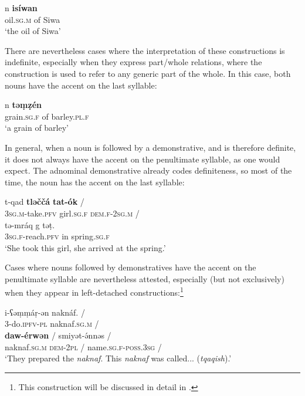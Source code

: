 \documentclass[output=paper]{langsci/langscibook}
\begin{document}
\begin{exe}
\ex\label{5ex:24}
	n	{\textbf{isíwan}} \\
	oil.{\textsc{sg.m}}	of	Siwa \\
\glt	`the oil of Siwa'
\end{exe}

There are nevertheless cases where the interpretation of these constructions is indefinite, especially when they express part/whole relations, where the construction is used to refer to any generic part of the whole. In this case, both nouns have the accent on the last syllable:

\begin{exe}
\ex\label{5ex:25}
	n	{\textbf{təṃẓén}} \\
	grain.{\textsc{sg.f}}	of	barley.{\textsc{pl.f}} \\
\glt	`a grain of barley'
\end{exe}

In general, when a noun is followed by a demonstrative, and is therefore definite, it does not always have the accent on the penultimate syllable, as one would expect. The adnominal demonstrative already codes definiteness, so most of the time, the noun has the accent on the last syllable:

\begin{exe}
\ex\label{5ex:26}
\gll	t-qad		{\textbf{tləččá}}	{\textbf{tat-ók}}	/ \\
	{\textsc{3sg.m}}-take.{\textsc{pfv}}	girl.{\textsc{sg.f}}	{\textsc{dem.f-2sg.m}}	/ \\
\glt 
\exi{}
\gll	tə-mráq	g	təṭ. \\
	{\textsc{3sg.f}}-reach.{\textsc{pfv}}	in	spring.{\textsc{sg.f}} \\
\glt	`She took this girl, she arrived at the spring.'
\end{exe}

Cases where nouns followed by demonstratives have the accent on the penultimate syllable are nevertheless attested, especially (but not exclusively) when they appear in left-detached constructions:\footnote{This construction will be discussed in detail in .}

\begin{exe}
\ex\label{5ex:27}
\gll	i-ʕəṃṃáṛ-ən	naknáf.	/ \\
	3-do.{\textsc{ipfv-pl}}	naknaf.{\textsc{sg.m}}	/ \\
\glt
\exi{}
	{\textbf{daw-érwən}}	/	smiyət-ə́nnəs	/ \\
	naknaf.{\textsc{sg.m}}	{\textsc{dem-2pl}}	/	name.{\textsc{sg.f-poss.3sg}}	/ \\
\glt	`They prepared the {\emph{naknaf}}. This {\emph{naknaf}} was called... ({\emph{tqaqish}}).'
\end{exe}
\end{document}
